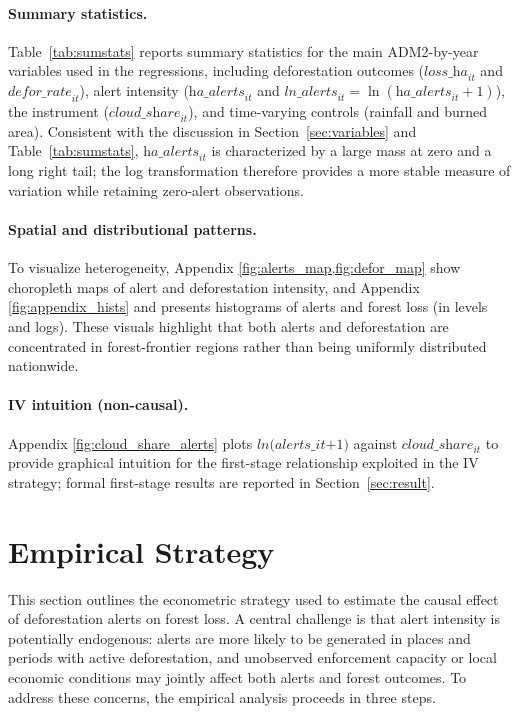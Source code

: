 \documentclass[hidelinks,12pt]{article}
\begin{document}
\paragraph{Summary statistics.}
Table~\ref{tab:sumstats} reports summary statistics for the main ADM2-by-year variables used in the regressions, including deforestation outcomes ($\textit{loss\_ha}_{it}$ and $\textit{defor\_rate}_{it}$), alert intensity ($\textit{ha\_alerts}_{it}$ and $\textit{ln\_alerts}_{it}=\ln(\textit{ha\_alerts}_{it}+1)$), the instrument ($\textit{cloud\_share}_{it}$), and time-varying controls (rainfall and burned area).
Consistent with the discussion in Section~\ref{sec:variables} and Table~\ref{tab:sumstats}, $\textit{ha\_alerts}_{it}$ is characterized by a large mass at zero and a long right tail; the log transformation therefore provides a more stable measure of variation while retaining zero-alert observations.

\paragraph{Spatial and distributional patterns.}
To visualize heterogeneity, Appendix \cref{fig:alerts_map,fig:defor_map} show choropleth maps of alert and deforestation intensity, and Appendix \cref{fig:appendix_hists} and presents  histograms of alerts and forest loss (in levels and logs). These visuals highlight that both alerts and deforestation are concentrated in forest-frontier regions rather than being uniformly distributed nationwide.

\paragraph{IV intuition (non-causal).}
Appendix \cref{fig:cloud_share_alerts} plots $\textit{ln(alerts\_{it}+1)}$ against $\textit{cloud\_share}_{it}$ to provide graphical intuition for the first-stage relationship exploited in the IV strategy; formal first-stage results are reported in Section~\ref{sec:result}.


\FloatBarrier
\section{Empirical Strategy} \label{sec:empirical_strategy}
This section outlines the econometric strategy used to estimate the causal effect of deforestation alerts on forest loss. A central challenge is that alert intensity is potentially endogenous: alerts are more likely to be generated in places and periods with active deforestation, and unobserved enforcement capacity or local economic conditions may jointly affect both alerts and forest outcomes. To address these concerns, the empirical analysis proceeds in three steps.
\end{document}
